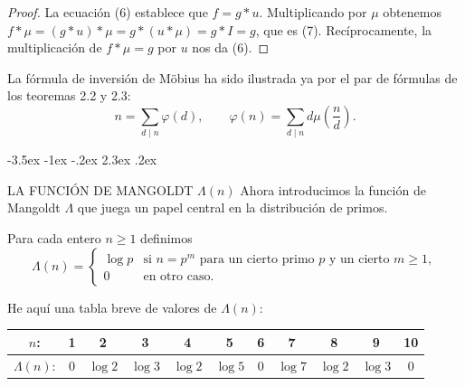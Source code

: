 \documentclass[12pt,a4paper]{book}
\makeatletter
\renewcommand\section{\@startsection{section}{1}{\z@}%
  {-3.5ex \@plus -1ex \@minus -.2ex}%
  {2.3ex \@plus .2ex}%
  {\normalfont\Large\bfseries\raggedright}}
\makeatother
\begin{document}
    \begin{proof}
        La ecuación (6) establece que $f=g*u$. Multiplicando por $\mu$ obtenemos
        $f*\mu=(g*u)*\mu=g*(u*\mu)=g*I=g$, que es (7). Recíprocamente, la multiplicación de
        $f*\mu=g$ por $u$ nos da (6).
    \end{proof}

    La fórmula de inversión de Möbius ha sido ilustrada ya por el par de fórmulas de los
    teoremas 2.2 y 2.3:
    \begin{equation*}
        n=\sum_{d\mid n}\varphi(d),\qquad \varphi(n)=\sum_{d\mid n}d\mu\left(\frac{n}{d}\right).
    \end{equation*}

    \section{LA FUNCIÓN DE MANGOLDT \texorpdfstring{$\Lambda(n)$}{Λ(n)}}\label{sim:Lam}
    Ahora introducimos la función de Mangoldt $\Lambda$ que juega un papel central en la
    distribución de primos.

    \begin{definicion}
        Para cada entero $n\geq1$ definimos
        \begin{equation*}
            \Lambda(n)=
            \begin{cases}
                \log p & \text{si } n=p^{m} \text{ para un cierto primo } p \text{ y un cierto } m\geq1,\\
                0 & \text{en otro caso.}
            \end{cases}
        \end{equation*}
    \end{definicion}

    He aquí una tabla breve de valores de $\Lambda(n)$:
    \begin{center}
        \begin{tabular}{c|cccccccccc}
            $n$: & 1 & 2 & 3 & 4 & 5 & 6 & 7 & 8 & 9 & 10\\
            \hline
            $\Lambda(n)$: & 0 & $\log2$ & $\log3$ & $\log2$ & $\log5$ & 0 & $\log7$ &
            $\log2$ & $\log3$ & 0
        \end{tabular}
    \end{center}
\end{document}
